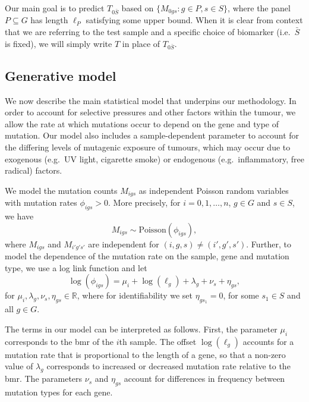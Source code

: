 \documentclass[../thesis.tex]{subfiles}
\begin{document}
Our main goal is to predict $T_{0\bar{S}}$ based on $\{M_{0gs}: g \in P, s \in S\}$, where the panel $P \subseteq G$ has length $\ell_P$ satisfying some upper bound. When it is clear from context that we are referring to the test sample and a specific choice of biomarker (i.e.~$\bar{S}$ is fixed), we will simply write $T$ in place of $T_{0\bar{S}}$. 

\subsection{Generative model \label{sec:genmodel}}
We now describe the main statistical model that underpins our methodology. In order to account for selective pressures and other factors within the tumour, we allow the rate at which mutations occur to depend on the gene and type of mutation. Our model also includes a sample-dependent parameter to account for the differing levels of mutagenic exposure of tumours, which may occur due to exogenous (e.g.~UV light, cigarette smoke) or endogenous (e.g.~inflammatory, free radical) factors.  

We model the mutation counts $M_{igs}$ as independent Poisson random variables with mutation rates $\phi_{igs} > 0$. More precisely, for $i = 0, 1, \ldots, n$, $g \in G$ and $s \in S$, we have
\begin{equation}
    \label{eq:Poisson}
M_{igs} \sim \mathrm{Poisson}(\phi_{igs}),
\end{equation}
where $M_{igs}$ and $M_{i'g's'}$ are independent for $(i,g,s) \neq (i',g',s')$.  Further, to model the dependence of the mutation rate on the sample, gene and mutation type, we use a log link function and let 
\begin{equation}
    \label{eq:loglink}
\log(\phi_{igs}) =  \mu_i + \log(\ell_g) + \lambda_g + \nu_s + \eta_{gs},
\end{equation} 
for $\mu_i, \lambda_{g},\nu_{s},\eta_{gs} \in \mathbb{R}$, where for identifiability we set $\eta_{gs_1} = 0$, for  some $s_1 \in S$ and all $g \in G$. 

The terms in our model can be interpreted as follows. First, the parameter $\mu_i$ corresponds to the \gls{bmr} of the $i$th sample. The offset $\log(\ell_g)$ accounts for a mutation rate that is proportional to the length of a gene, so that a non-zero value of $\lambda_g$ corresponds to increased or decreased mutation rate relative to the \gls{bmr}.  The parameters $\nu_s$ and $\eta_{gs}$ account for differences in frequency between mutation types for each gene. 
\end{document}
